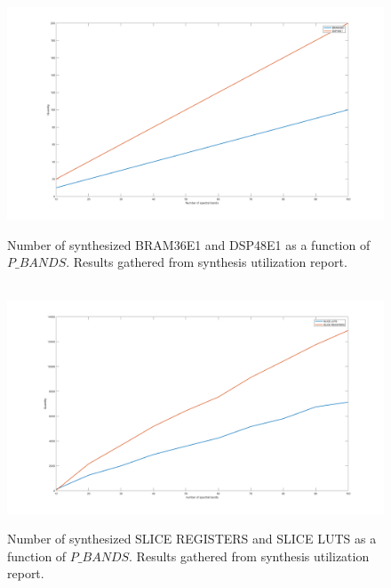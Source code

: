 \begin{figure}[H]

\hbox{\hspace*{-2cm}                                                           
   \includegraphics[scale=0.3]{images/number_of_BRAMS_and_DSP48.png}}
  \caption{Number of synthesized BRAM36E1 and DSP48E1 as a function of $P\_BANDS$. Results gathered from synthesis utilization report. } 
  \label{fig:primitves_correlation}
\end{figure}


\begin{figure}[H]

\hbox{\hspace*{-2cm}                                                           
   \includegraphics[scale=0.3]{images/correlation_luts_and_registers.png}}
  \caption{Number of synthesized SLICE REGISTERS and SLICE LUTS as a function of $P\_BANDS$. Results gathered from synthesis utilization report. } 
  \label{fig:luts_and_regs_corr}
\end{figure}


